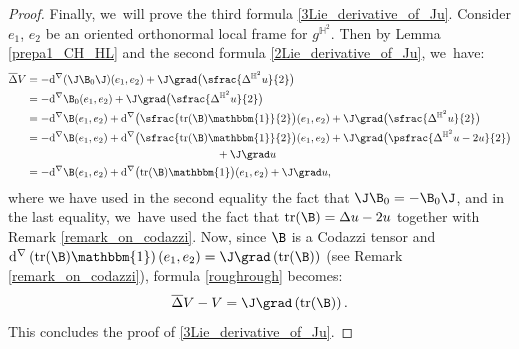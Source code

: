 \begin{proof}
Finally, we~will prove the third formula \eqref{3Lie_derivative_of_Ju}. Consider $e_1$, $e_2$ be an oriented orthonormal local frame for $g^{\mathbb{H}^2}$. Then by Lemma \ref{prepa1_CH_HL} and the second formula \eqref{2Lie_derivative_of_Ju}, we~have:
\begin{equation}\label{roughrough}
\begin{split}
\overline{\Delta}V&=-\mathrm{d}^{\nabla}(\J\B_0\J)(e_1,e_2)+\J\grad\bigl(\sfrac{\Delta^{\mathbb{H}^2} u}{2}\bigr)\\
&=-\mathrm{d}^{\nabla}\B_0(e_1,e_2)+\J\grad\bigl(\sfrac{\Delta^{\mathbb{H}^2} u}{2}\bigr)\\
&= -\mathrm{d}^{\nabla}\B(e_1,e_2)+\mathrm{d}^{\nabla}\bigl(\sfrac{\mathrm{tr}(\B)\mathbbm{1}}{2} \bigr)(e_1,e_2)+ \J\grad\bigl(\sfrac{\Delta^{\mathbb{H}^2} u}{2}\bigr)\\
&=-\mathrm{d}^{\nabla}\B(e_1,e_2)+\mathrm{d}^{\nabla}\bigl(\sfrac{\mathrm{tr}(\B)\mathbbm{1}}{2} \bigr)(e_1,e_2)+ \J\grad\bigl(\psfrac{\Delta^{\mathbb{H}^2} u-2u}{2}\bigr)\\
&\hspace*{6.15cm}+ \J\grad u \\
&=-\mathrm{d}^{\nabla}\B(e_1,e_2)+\mathrm{d}^{\nabla}\bigl(\mathrm{tr}(\B)\mathbbm{1}\bigr)(e_1,e_2)+ \J\grad u,
\end{split}
\end{equation}
where we have used in the second equality the fact that \(\J\B_0 = -\B_0\J\), and in the last equality, we~have used the fact that \(\mathrm{tr}(\B) = \Delta u - 2u\) together with Remark \ref{remark_on_codazzi}. Now, since \(\B\) is a Codazzi tensor and \(\mathrm{d}^{\nabla}\left(\mathrm{tr}(\B)\mathbbm{1} \right)(e_1,e_2) = \J\grad\left(\mathrm{tr}(\B)\right)\) (see Remark \ref{remark_on_codazzi}), formula \eqref{roughrough} becomes:
\begin{equation}\label{Tension_Ju}
\overline{\Delta}V-V=\J\grad\left(\mathrm{tr}(\B) \right).
\end{equation}
This concludes the proof of \eqref{3Lie_derivative_of_Ju}.
\end{proof}

